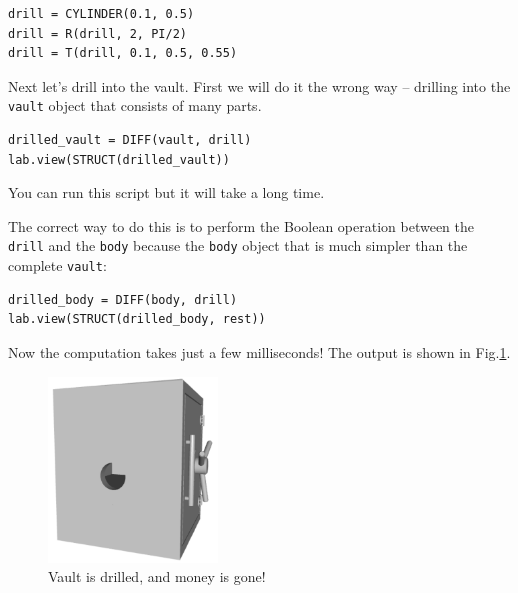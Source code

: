 \begin{bbox}
\begin{verbatim}
drill = CYLINDER(0.1, 0.5)
drill = R(drill, 2, PI/2)
drill = T(drill, 0.1, 0.5, 0.55)
\end{verbatim}
\end{bbox}
\vspace{6mm}

\noindent
Next let's drill into the vault. First we will do it 
the wrong way -- drilling into the {\tt vault} object
that consists of many parts. \\

\begin{bbox}
\begin{verbatim}
drilled_vault = DIFF(vault, drill)
lab.view(STRUCT(drilled_vault))
\end{verbatim}
\end{bbox}
\vspace{6mm}

\noindent
You can run this script but it will take a long time.

The correct way to do this is to perform the Boolean 
operation between the {\tt drill} and the {\tt body} 
because the {\tt body} object that is much simpler 
than the complete {\tt vault}: \\

\begin{bbox}
\begin{verbatim}
drilled_body = DIFF(body, drill)
lab.view(STRUCT(drilled_body, rest))
\end{verbatim}
\end{bbox}
\vspace{6mm}

\noindent
Now the computation takes just a few milliseconds!
The output is shown in Fig.\ref{fig:vault2}.

\begin{figure}[!ht]
\begin{center}
\includegraphics[width=0.4\textwidth]{img/vault2.png}
\end{center}
\vspace{-4mm}
\caption{Vault is drilled, and money is gone!}
\label{fig:vault2}
\end{figure}
\noindent




